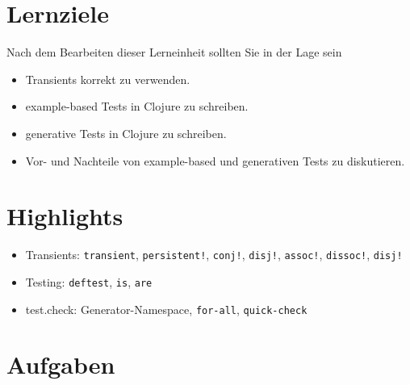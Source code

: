 \documentclass[11pt,a4paper]{article}
\theoremstyle{break}
\begin{document}
\section{Lernziele}

Nach dem Bearbeiten dieser Lerneinheit sollten Sie in der Lage sein

\begin{itemize}
    \item Transients korrekt zu verwenden.
    \item example-based Tests in Clojure zu schreiben.
    \item generative Tests in Clojure zu schreiben.
    \item Vor- und Nachteile von example-based und generativen Tests zu diskutieren.
\end{itemize}

\section{Highlights}

\begin{itemize}
    \item Transients: \verb|transient|, \verb|persistent!|, \verb|conj!|, \verb|disj!|, \verb|assoc!|, \verb|dissoc!|, \verb|disj!|
    \item Testing: \verb|deftest|, \verb|is|, \verb|are|
    \item test.check: Generator-Namespace, \verb|for-all|, \verb|quick-check|
\end{itemize}



\section{Aufgaben}
\end{document}
